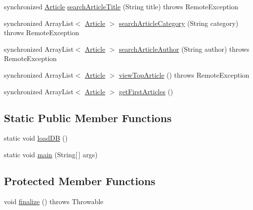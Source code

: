 \begin{DoxyCompactItemize}
synchronized \hyperlink{classes_1_1deusto_1_1server_1_1jdo_1_1_article}{Article} \hyperlink{classes_1_1deusto_1_1server_1_1_server_a56ae654d89e8113c79615077ed4a6e24}{search\+Article\+Title} (String title)  throws Remote\+Exception 
\item 
synchronized Array\+List$<$ \hyperlink{classes_1_1deusto_1_1server_1_1jdo_1_1_article}{Article} $>$ \hyperlink{classes_1_1deusto_1_1server_1_1_server_ab2729689bb71bd707881b563cdf2a006}{search\+Article\+Category} (String category)  throws Remote\+Exception 
\item 
synchronized Array\+List$<$ \hyperlink{classes_1_1deusto_1_1server_1_1jdo_1_1_article}{Article} $>$ \hyperlink{classes_1_1deusto_1_1server_1_1_server_a5f04113ce0c895e13e1bde76d7b41eb8}{search\+Article\+Author} (String author)  throws Remote\+Exception 
\item 
synchronized Array\+List$<$ \hyperlink{classes_1_1deusto_1_1server_1_1jdo_1_1_article}{Article} $>$ \hyperlink{classes_1_1deusto_1_1server_1_1_server_ada6d55bcd79444de821eaeb6b21c44b8}{view\+Top\+Article} ()  throws Remote\+Exception 
\item 
synchronized Array\+List$<$ \hyperlink{classes_1_1deusto_1_1server_1_1jdo_1_1_article}{Article} $>$ \hyperlink{classes_1_1deusto_1_1server_1_1_server_a64dfcee7821b0cc581367c1b21d9f97f}{get\+First\+Articles} ()
\end{DoxyCompactItemize}
\subsection*{Static Public Member Functions}
\begin{DoxyCompactItemize}
\item 
static void \hyperlink{classes_1_1deusto_1_1server_1_1_server_a0517d84248cdc6489471f9e274b6d983}{load\+DB} ()
\item 
static void \hyperlink{classes_1_1deusto_1_1server_1_1_server_a750bb0d7dbd89246a3602f2e20d03fb5}{main} (String\mbox{[}$\,$\mbox{]} args)
\end{DoxyCompactItemize}
\subsection*{Protected Member Functions}
\begin{DoxyCompactItemize}
\item 
void \hyperlink{classes_1_1deusto_1_1server_1_1_server_a168b866b961a3d54b38834db9b52ca80}{finalize} ()  throws Throwable 
\end{DoxyCompactItemize}



